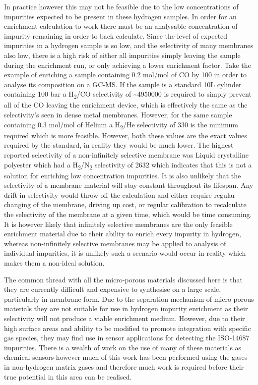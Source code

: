 In practice however this may not be feasible due to the low concentrations of impurities expected to be 
present in these hydrogen samples. In order for an enrichment calculation to work there must be an analysable 
concentration of impurity remaining in order to back calculate. Since the level of expected impurities in a 
hydrogen sample is so low, and the selectivity of many membranes also low, there is a high risk of either all 
impurities simply leaving the sample during the enrichment run, or only achieving a lower enrichment factor. 
Take the example of enriching a sample containing 0.2 \textmu mol/mol of CO by 100 in order to analyse its 
composition on 
a GC-MS. If the sample is a standard 10L cylinder containing 100 bar a H\textsubscript{2}/CO selectivity of 
\textasciitilde 4950000 is required to simply prevent all of the CO leaving the enrichment device, which is effectively the same as the selectivity’s seen in dense metal membranes. However, for the same sample containing 0.3 \textmu mol/mol 
of Helium a H\textsubscript{2}/He selectivity of 330 is the minimum required which is more feasible. However, both these values 
are the exact values required by the standard, in reality they would be much lower. The highest reported 
selectivity of a non-infinitely selective membrane was Liquid crystalline polyester which had a 
H\textsubscript{2}/N\textsubscript{2} 
selectivity of  2632 \cite{Weinkauf1992} which indicates that this  is not a solution for enriching low concentration impurities. 
It is also unlikely that the selectivity of a membrane material will stay constant throughout its lifespan. 
Any drift in selectivity would throw off the calculation and either require regular changing of the membrane, 
driving up cost, or regular calibration to recalculate the selectivity of the membrane at a given time, which 
would be time consuming. It is however likely that infinitely selective membranes are the only feasible 
enrichment material due to their ability to enrich every impurity in hydrogen, whereas non-infinitely 
selective membranes may be applied to analysis of individual impurities, it is unlikely such a scenario 
would occur in reality which makes them a non-ideal solution. 

The common thread with all the micro-porous materials discussed here is that they are currently difficult and expensive to synthesise on a large scale, particularly in membrane form. Due to the separation mechanism of micro-porous materials they are not suitable for use in hydrogen impurity enrichment as their selectivity will not produce a viable enrichment medium. However, due to their high surface areas and ability to be modified to promote integration with specific gas species, they may find use in sensor applications for detecting the ISO-14687 impurities. There is a wealth of work on the use of many of these materials as chemical sensors however much of this work has been performed using the gases in non-hydrogen matrix gases and therefore much work is required before their true potential in this area can be realised. 

